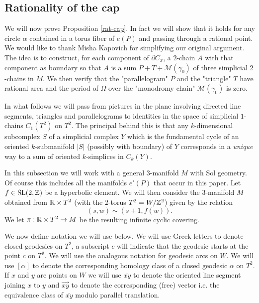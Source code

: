 \subsection{Rationality of the cap}\label{rat-cap11}
We will now prove Proposition \ref{rat-cap}.  In fact we will show
that it holds for any circle $\alpha$ contained in a torus fiber
of $e(P)$ and passing through a rational point. We would like to
thank Misha Kapovich for simplifying  our original argument. The
idea is to construct, for each component of $\partial C_x$, a
$2$-chain $A$ with that component as boundary so that $A$ is a sum
$P+ T  +\mathcal{M}(\gamma_0)$ of three simplicial $2$-chains in
$M$. We then verify that the "parallelogram" $P$  and the "triangle"
$T$  have rational area and the period of $\Omega$ over the "monodromy
chain" $\mathcal{M}(\gamma_0)$ is zero.

In what follows we will pass from pictures in the plane involving
directed line segments, triangles and parallelograms to identities
in the space of simplicial $1$-chains $C_1(T^2)$  on $T^2$. The
principal behind this is that any $k$-dimensional subcomplex $S$
of a simplicial complex $Y$ which is the fundamental cycle of an
oriented $k$-submanifold $|S|$ (possibly with boundary) of $Y$
corresponds in a {\it unique} way to a sum of oriented $k$-simplices
in $C_k(Y)$.



In this subsection we will work with a general $3$-manifold $M$
with Sol geometry. Of course this includes all the manifolds $e'(P)$
that occur in this paper. Let $f \in \operatorname{SL}(2,\mathbb{Z})$ be a hyperbolic
element. We will then consider the $3$-manifold $M$ obtained from
$ \mathbb{R} \times T^2$ (with the $2$-torus $T^2 = W/ \mathbb{Z}^2$) given by the
relation
\begin{equation}\label{glueing}
(s,w) \sim (s+1,f(w)).  
\end{equation}
We let $\pi: \mathbb{R}\times T^2 \to M$ be the resulting infinite cyclic covering. 



We now define notation we will use below. We will use Greek letters
to denote closed geodesics on $T^2$, a subscript $c$  will indicate
that the geodesic starts at the point $c$ on $T^2$. We will use the
analogous notation for geodesic arcs on $W$.  We will use $[\alpha]$
to denote the corresponding homology class of a closed geodesic $\alpha$ on $T^2$. 
If $x$ and $y$ are points on $W$ we will use $\overline{xy}$ to
denote the oriented line segment joining $x$ to $y$ and
$\overrightarrow{xy}$ to denote the corresponding (free) vector
i.e. the equivalence class of $\overline{xy}$ modulo parallel translation. 
   
